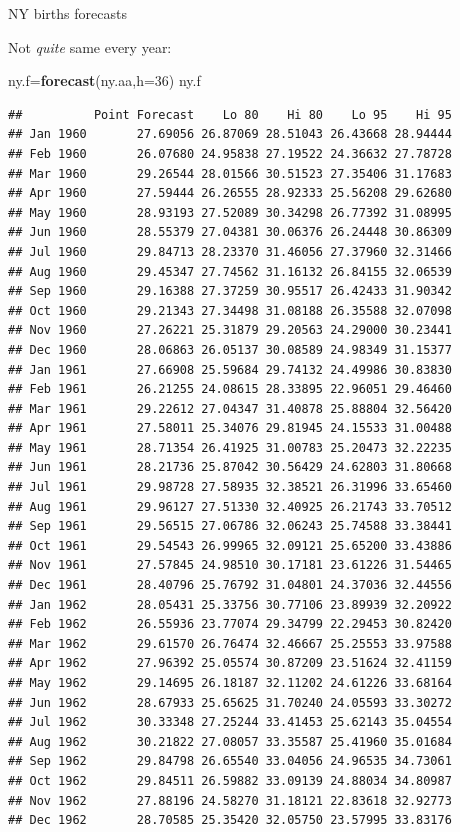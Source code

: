 \documentclass[ignorenonframetext,]{beamer}
\newenvironment{Shaded}{\begin{snugshade}}{\end{snugshade}}
\newcommand{\DataTypeTok}[1]{\textcolor[rgb]{0.13,0.29,0.53}{#1}}
\newcommand{\DecValTok}[1]{\textcolor[rgb]{0.00,0.00,0.81}{#1}}
\newcommand{\KeywordTok}[1]{\textcolor[rgb]{0.13,0.29,0.53}{\textbf{#1}}}
\newcommand{\NormalTok}[1]{#1}
\begin{document}
\begin{frame}[fragile]{NY births forecasts}
\protect\hypertarget{ny-births-forecasts}{}

Not \emph{quite} same every year:

\tiny

\begin{Shaded}
\begin{Highlighting}[]
\NormalTok{ny.f=}\KeywordTok{forecast}\NormalTok{(ny.aa,}\DataTypeTok{h=}\DecValTok{36}\NormalTok{)}
\NormalTok{ny.f}
\end{Highlighting}
\end{Shaded}

\begin{verbatim}
##          Point Forecast    Lo 80    Hi 80    Lo 95    Hi 95
## Jan 1960       27.69056 26.87069 28.51043 26.43668 28.94444
## Feb 1960       26.07680 24.95838 27.19522 24.36632 27.78728
## Mar 1960       29.26544 28.01566 30.51523 27.35406 31.17683
## Apr 1960       27.59444 26.26555 28.92333 25.56208 29.62680
## May 1960       28.93193 27.52089 30.34298 26.77392 31.08995
## Jun 1960       28.55379 27.04381 30.06376 26.24448 30.86309
## Jul 1960       29.84713 28.23370 31.46056 27.37960 32.31466
## Aug 1960       29.45347 27.74562 31.16132 26.84155 32.06539
## Sep 1960       29.16388 27.37259 30.95517 26.42433 31.90342
## Oct 1960       29.21343 27.34498 31.08188 26.35588 32.07098
## Nov 1960       27.26221 25.31879 29.20563 24.29000 30.23441
## Dec 1960       28.06863 26.05137 30.08589 24.98349 31.15377
## Jan 1961       27.66908 25.59684 29.74132 24.49986 30.83830
## Feb 1961       26.21255 24.08615 28.33895 22.96051 29.46460
## Mar 1961       29.22612 27.04347 31.40878 25.88804 32.56420
## Apr 1961       27.58011 25.34076 29.81945 24.15533 31.00488
## May 1961       28.71354 26.41925 31.00783 25.20473 32.22235
## Jun 1961       28.21736 25.87042 30.56429 24.62803 31.80668
## Jul 1961       29.98728 27.58935 32.38521 26.31996 33.65460
## Aug 1961       29.96127 27.51330 32.40925 26.21743 33.70512
## Sep 1961       29.56515 27.06786 32.06243 25.74588 33.38441
## Oct 1961       29.54543 26.99965 32.09121 25.65200 33.43886
## Nov 1961       27.57845 24.98510 30.17181 23.61226 31.54465
## Dec 1961       28.40796 25.76792 31.04801 24.37036 32.44556
## Jan 1962       28.05431 25.33756 30.77106 23.89939 32.20922
## Feb 1962       26.55936 23.77074 29.34799 22.29453 30.82420
## Mar 1962       29.61570 26.76474 32.46667 25.25553 33.97588
## Apr 1962       27.96392 25.05574 30.87209 23.51624 32.41159
## May 1962       29.14695 26.18187 32.11202 24.61226 33.68164
## Jun 1962       28.67933 25.65625 31.70240 24.05593 33.30272
## Jul 1962       30.33348 27.25244 33.41453 25.62143 35.04554
## Aug 1962       30.21822 27.08057 33.35587 25.41960 35.01684
## Sep 1962       29.84798 26.65540 33.04056 24.96535 34.73061
## Oct 1962       29.84511 26.59882 33.09139 24.88034 34.80987
## Nov 1962       27.88196 24.58270 31.18121 22.83618 32.92773
## Dec 1962       28.70585 25.35420 32.05750 23.57995 33.83176
\end{verbatim}

\normalsize

\end{frame}
\end{document}
